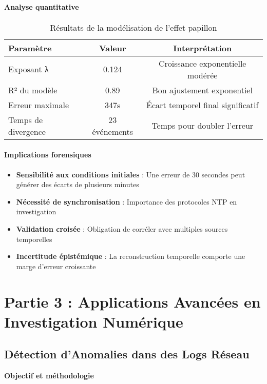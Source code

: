 \documentclass[12pt,a4paper]{article}
\begin{document}
\paragraph{Analyse quantitative}
\begin{table}[H]
\centering
\begin{tabular}{|l|c|c|}
\hline
\textbf{Paramètre} & \textbf{Valeur} & \textbf{Interprétation} \\
\hline
Exposant λ & 0.124 & Croissance exponentielle modérée \\
\hline
R² du modèle & 0.89 & Bon ajustement exponentiel \\
\hline
Erreur maximale & 347s & Écart temporel final significatif \\
\hline
Temps de divergence & 23 événements & Temps pour doubler l'erreur \\
\hline
\end{tabular}
\caption{Résultats de la modélisation de l'effet papillon}
\end{table}

\paragraph{Implications forensiques}
\begin{itemize}
\item \textbf{Sensibilité aux conditions initiales} : Une erreur de 30 secondes peut générer des écarts de plusieurs minutes
\item \textbf{Nécessité de synchronisation} : Importance des protocoles NTP en investigation
\item \textbf{Validation croisée} : Obligation de corréler avec multiples sources temporelles
\item \textbf{Incertitude épistémique} : La reconstruction temporelle comporte une marge d'erreur croissante
\end{itemize}

\section{Partie 3 : Applications Avancées en Investigation Numérique}

\subsection{Détection d'Anomalies dans des Logs Réseau}

\textbf{Objectif et méthodologie}
\end{document}
